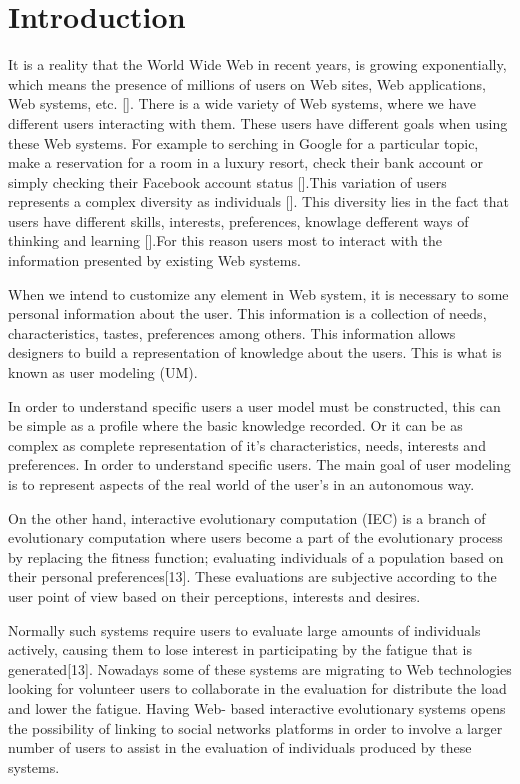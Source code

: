 \chapter{Introduction} \label{introduction} 


\par It is a reality that the World Wide Web in recent years, is growing
exponentially, which means the presence of millions of users on Web sites, Web
applications, Web systems, etc. []. There is a wide variety of Web systems,
where we have different users interacting with them. These users have different
goals when using these Web systems. For example to serching  in Google
\cite{google} for a particular topic, make a reservation for a room in a luxury
resort, check their bank account or simply checking their Facebook account
status [].This variation of users represents a complex diversity as individuals
[]. This diversity lies in the fact that users have different skills, interests,
preferences, knowlage defferent  ways of thinking and learning [].For this
reason users most to interact with the information presented by existing Web
systems. \par When we intend to customize any element in Web system,  it is
necessary to some personal information about the user. This information is a
collection of needs, characteristics, tastes, preferences among others.  This
information allows designers to build a representation of knowledge about the
users. This is what is known as user modeling (UM).    
\par  In order to
understand specific users a user model must be constructed, this can be simple
as a profile where the basic knowledge recorded. Or it can be as complex as
complete representation of it's characteristics, needs, interests and
preferences. In order to understand specific users. The main goal of user
modeling is to represent aspects of the real world of the user's in an autonomous
way.

\par On the other hand, interactive evolutionary computation (IEC)
is a branch of evolutionary computation where users become a part of the
evolutionary process by replacing the fitness function; evaluating individuals
of a population based on their personal preferences[13]. These evaluations are
subjective according to the user point of view based on their perceptions,
interests and desires.  
\par Normally such systems require users to evaluate large amounts of individuals 
actively, causing them to lose interest in participating by the fatigue that 
is generated[13]. Nowadays some of these systems
are migrating to  Web technologies looking for volunteer users to collaborate
in the evaluation for distribute the load and lower the fatigue. Having Web-
based interactive evolutionary systems opens the possibility of linking to social networks 
platforms in order to involve a larger number of users to assist in
the evaluation of individuals produced by these systems.


